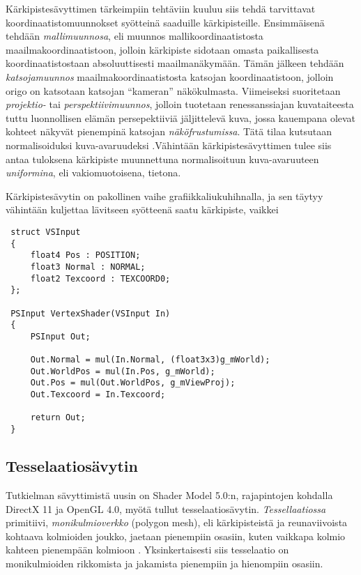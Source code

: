 \documentclass[finnish]{tktltiki2}
\theoremstyle{definition}
\theoremstyle{remark}
\begin{document}
Kärkipistesävyttimen tärkeimpiin tehtäviin kuuluu siis tehdä tarvittavat koordinaatistomuunnokset syötteinä saaduille kärkipisteille. Ensimmäisenä tehdään \emph{mallimuunnosa}, eli muunnos mallikoordinaatistosta maailmakoordinaatistoon, jolloin kärkipiste sidotaan omasta paikallisesta koordinaatistostaan absoluuttisesti maailmanäkymään. Tämän jälkeen tehdään \emph{katsojamuunnos} maailmakoordinaatistosta katsojan koordinaatistoon, jolloin origo on katsotaan katsojan ``kameran'' näkökulmasta. Viimeiseksi suoritetaan \emph{projektio-} tai \emph{perspektiivimuunnos}, jolloin tuotetaan renessanssiajan kuvataiteesta tuttu luonnollisen elämän persepektiiviä jäljittelevä kuva, jossa kauempana olevat kohteet näkyvät pienempinä katsojan \emph{näköfrustumissa}. Tätä tilaa kutsutaan normalisoiduksi kuva-avaruudeksi \cite{Puh08}.Vähintään kärkipistesävyttimen tulee siis antaa tuloksena kärkipiste muunnettuna normalisoituun kuva-avaruuteen \emph{uniformina}, eli vakiomuotoisena, tietona. \cite{Puh08}

Kärkipistesävytin on pakollinen vaihe grafiikkaliukuhihnalla, ja sen täytyy vähintään kuljettaa lävitseen syötteenä saatu kärkipiste, vaikkei 

\begin{lstlisting}
 struct VSInput
 {
	 float4 Pos : POSITION;
	 float3 Normal : NORMAL;
	 float2 Texcoord : TEXCOORD0;
 };
 
 PSInput VertexShader(VSInput In)
 {
	 PSInput Out;	
	
	 Out.Normal = mul(In.Normal, (float3x3)g_mWorld);
	 Out.WorldPos = mul(In.Pos, g_mWorld);	
	 Out.Pos = mul(Out.WorldPos, g_mViewProj);	
	 Out.Texcoord = In.Texcoord;		
		
	 return Out;
 }
\end{lstlisting}

\subsection{Tesselaatiosävytin}

Tutkielman sävyttimistä uusin on Shader Model 5.0:n, rajapintojen kohdalla DirectX 11 ja OpenGL 4.0, myötä tullut tesselaatiosävytin. \emph{Tessellaatiossa} primitiivi, \emph{monikulmioverkko} (polygon mesh), eli kärkipisteistä ja reunaviivoista kohtaava kolmioiden joukko\cite{Puh08}, jaetaan pienempiin osasiin, kuten vaikkapa kolmio kahteen pienempään kolmioon \cite{Nvi10}. Yksinkertaisesti siis tesselaatio on monikulmioiden rikkomista ja jakamista pienempiin ja hienompiin osasiin. 
\end{document}
